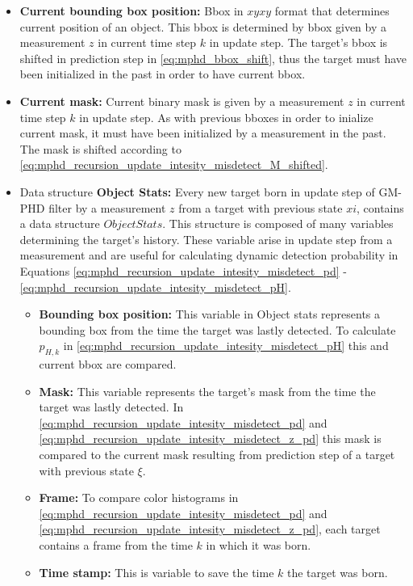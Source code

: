 \begin{itemize}
  \item \textbf{Current bounding box position:} Bbox in $xyxy$ format that determines current position of an object.
  This bbox is determined by bbox given by a measurement $z$ in current time step $k$ in update step. The target's
  bbox is shifted in prediction step in \eqref{eq:mphd_bbox_shift}, thus the target must have been initialized in the
  past in order to have current bbox.
  \item \textbf{Current mask:} Current binary mask is given by a measurement $z$ in current time step $k$ in update
  step. As with previous bboxes in order to inialize current mask, it must have been initialized by a measurement in
  the past. The mask is shifted according to \eqref{eq:mphd_recursion_update_intesity_misdetect_M_shifted}.
  \item Data structure \textbf{Object Stats:} Every new target born in update step of GM-PHD filter by a measurement $z$ from a target with previous state $xi$, contains a data structure $Object Stats$. This structure is composed of many variables determining the target's history. These variable arise in update step from a measurement and are useful for calculating dynamic detection probability in Equations \eqref{eq:mphd_recursion_update_intesity_misdetect_pd} - \eqref{eq:mphd_recursion_update_intesity_misdetect_pH}.
      \begin{itemize}
        \item \textbf{Bounding box position:} This variable in Object stats represents a bounding box from the time
        the target was lastly detected. To calculate $p_{H,k}$ in \eqref{eq:mphd_recursion_update_intesity_misdetect_pH} this and current bbox are compared.
        \item \textbf{Mask:} This variable represents the target's mask from the time the target was lastly detected. In \eqref{eq:mphd_recursion_update_intesity_misdetect_pd} and \eqref{eq:mphd_recursion_update_intesity_misdetect_z_pd} this mask is compared to the current mask
        resulting from prediction step of a target with previous state $\xi$.
        \item \textbf{Frame:} To compare color histograms in \eqref{eq:mphd_recursion_update_intesity_misdetect_pd}
        and \eqref{eq:mphd_recursion_update_intesity_misdetect_z_pd}, each target contains a frame from the time $k$
        in which
        it was born.
        \item \textbf{Time stamp:} This is variable to save the time $k$ the target was born.

\end{itemize}
\end{itemize}
